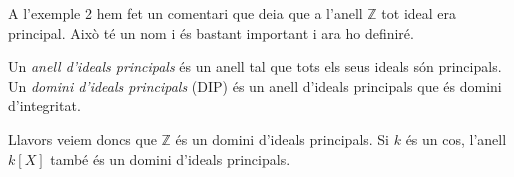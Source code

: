 \documentclass[../main.tex]{subfiles}
\begin{document}
A l'exemple 2 hem fet un comentari que deia que a l'anell $\mathbb{Z}$ tot ideal era principal. Això té un nom i és bastant important i ara ho definiré.


\begin{defi}
\label{def:dominiidealsprincipals} Un \textit{anell d'ideals principals} és un anell tal que tots els seus ideals són principals. Un \textit{domini d'ideals principals} (DIP) és un anell d'ideals principals que és domini d'integritat.
\end{defi}



Llavors veiem doncs que $\mathbb{Z}$ és un domini d'ideals principals. Si $k$ és un cos, l'anell $k[X]$ també és un domini d'ideals principals.
\end{document}
